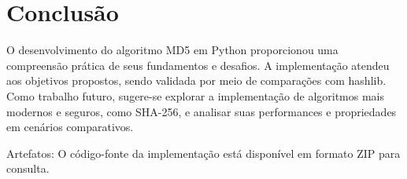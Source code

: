 \documentclass{article}
\begin{document}
\section{Conclusão}
O desenvolvimento do algoritmo MD5 em Python proporcionou uma compreensão prática de seus fundamentos e desafios. A implementação atendeu aos objetivos propostos, sendo validada por meio de comparações com hashlib. Como trabalho futuro, sugere-se explorar a implementação de algoritmos mais modernos e seguros, como SHA-256, e analisar suas performances e propriedades em cenários comparativos.

Artefatos: O código-fonte da implementação está disponível em formato ZIP para consulta.
\end{document}
